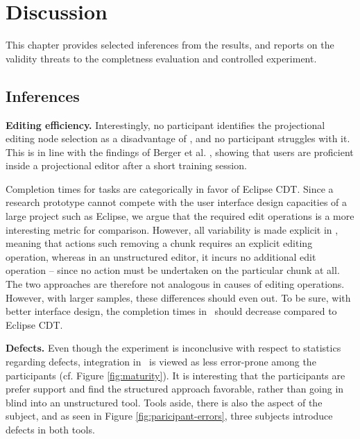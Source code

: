 \chapter{Discussion}
This chapter provides selected inferences from the results, and reports on the validity threats to the completness evaluation and controlled experiment.

\section{Inferences}
\textbf{Editing efficiency.} Interestingly, no participant identifies the projectional editing node selection as a disadvantage of \tooln, and no participant struggles with it. This is in line with the findings of Berger et al. \cite{berger2016mps}, showing that users are proficient inside a projectional editor after a short training session.

Completion times for tasks are categorically in favor of Eclipse CDT. Since a research prototype cannot compete with the user interface design capacities of a large project such as Eclipse, we argue that the required edit operations is a more interesting metric for comparison. However, all variability is made explicit in \tooln, meaning that actions such removing a chunk requires an explicit editing operation, whereas in an unstructured editor, it incurs no additional edit operation -- since no action must be undertaken on the particular chunk at all. The two approaches are therefore not analogous in causes of editing operations. However, with larger samples, these differences should even out. To be sure, with better interface design, the completion times in \tooln~should decrease compared to Eclipse CDT.

\textbf{Defects.} Even though the experiment is inconclusive with respect to statistics regarding defects, integration in \tooln~is viewed as less error-prone among the participants (cf. Figure \ref{fig:maturity}). It is interesting that the participants are prefer support and find the structured approach favorable, rather than going in blind into an unstructured tool. Tools aside, there is also the aspect of the subject, and as seen in Figure \ref{fig:paricipant-errors}, three subjects introduce defects in both tools. 

